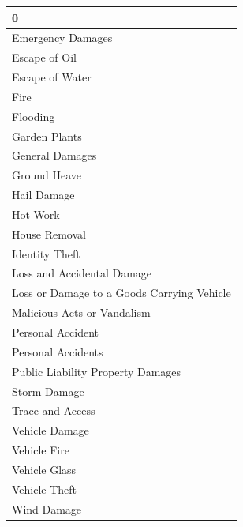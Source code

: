 \begin{tabular}{l}
\toprule
0 \\
\midrule
Emergency Damages \\
Escape of Oil \\
Escape of Water \\
Fire \\
Flooding \\
Garden Plants \\
General Damages \\
Ground Heave \\
Hail Damage \\
Hot Work \\
House Removal \\
Identity Theft \\
Loss and Accidental Damage \\
Loss or Damage to a Goods Carrying Vehicle \\
Malicious Acts or Vandalism \\
Personal Accident \\
Personal Accidents \\
Public Liability Property Damages \\
Storm Damage \\
Trace and Access \\
Vehicle Damage \\
Vehicle Fire \\
Vehicle Glass \\
Vehicle Theft \\
Wind Damage \\
\bottomrule
\end{tabular}
